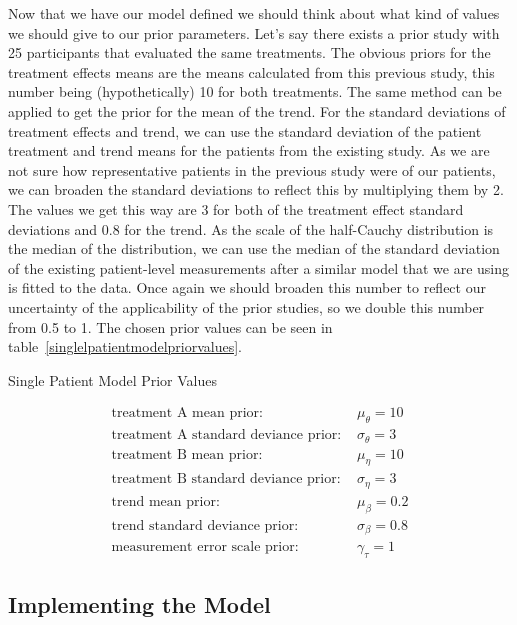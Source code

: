\documentclass[12pt,a4paper,leqno]{report}
\theoremstyle{plain}
\theoremstyle{definition}
\theoremstyle{remark}
\begin{document}
Now that we have our model defined we should think about what kind of values we should
give to our prior parameters. Let's say there exists a prior study with 25 participants
that evaluated the same treatments. The obvious priors for the treatment effects means
are the means calculated from this previous study, this number being (hypothetically) 10 for both
treatments. The same method can be applied to get the prior for the mean of the trend. For
the standard deviations of treatment effects and trend, we can use the standard deviation
of the patient treatment and trend means for the patients from the existing study. As we
are not sure how representative patients in the previous study were of our patients, we
can broaden the standard deviations to reflect this by multiplying them by 2. The values
we get this way are 3 for both of the treatment effect standard deviations and 0.8 for
the trend. As the scale of the half-Cauchy
distribution is the median of the distribution, we can use the median of
the standard deviation of the existing patient-level measurements after a similar model that we
are using is fitted to the data. Once again we should broaden this number to reflect our uncertainty of the
applicability of the prior studies, so we double this number from 0.5 to 1.
The chosen prior values can be seen in table\ \ref{singlelpatientmodelpriorvalues}.

\begin{table}[H]
    \caption{Single Patient Model Prior Values}\label{singlelpatientmodelpriorvalues}
    \begin{align}\label{}
        \text{treatment A mean prior: } & \mu_{\theta} = 10 \nonumber \\
        \text{treatment A standard deviance prior: } & \sigma_{\theta} = 3 \nonumber \\
        \text{treatment B mean prior: } & \mu_{\eta} = 10 \nonumber \\
        \text{treatment B standard deviance prior: } & \sigma_{\eta} = 3 \nonumber \\
        \text{trend mean prior: } & \mu_{\beta} = 0.2 \nonumber \\
        \text{trend standard deviance prior: } & \sigma_{\beta} = 0.8 \nonumber \\
        \text{measurement error scale prior: } & \gamma_{\tau} = 1 \nonumber
    \end{align}
\end{table}

\subsection{Implementing the Model}
\end{document}
